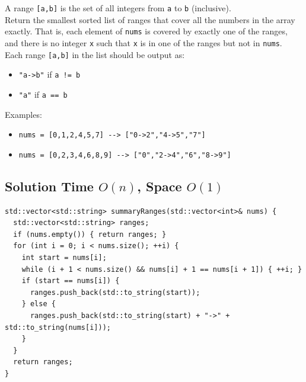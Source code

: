 A range {\colorbox{CodeBackground}{\lstinline|[a,b]|}} is the set of all integers from {\colorbox{CodeBackground}{\lstinline|a|}} to {\colorbox{CodeBackground}{\lstinline|b|}} (inclusive).\\

Return the smallest sorted list of ranges that cover all the numbers in the array exactly. That is, each element of {\colorbox{CodeBackground}{\lstinline|nums|}} is covered by exactly one of the ranges, and there is no integer {\colorbox{CodeBackground}{\lstinline|x|}} such that {\colorbox{CodeBackground}{\lstinline|x|}} is in one of the ranges but not in {\colorbox{CodeBackground}{\lstinline|nums|}}.\\

Each range {\colorbox{CodeBackground}{\lstinline|[a,b]|}} in the list should be output as:
\begin{itemize}
\item {\colorbox{CodeBackground}{\lstinline|"a->b"|}} if {\colorbox{CodeBackground}{\lstinline|a != b|}}
\item {\colorbox{CodeBackground}{\lstinline|"a"|}} if {\colorbox{CodeBackground}{\lstinline|a == b|}}
\end{itemize}

Examples:
\begin{itemize}
\item {\colorbox{CodeBackground}{\lstinline|nums = [0,1,2,4,5,7] --> ["0->2","4->5","7"]|}}
\item {\colorbox{CodeBackground}{\lstinline|nums = [0,2,3,4,6,8,9] --> ["0","2->4","6","8->9"]|}}
\end{itemize}

\subsection*{Solution {\scriptsize\color{gray}\Coffeecup\hspace{1mm}Time $O(n)$, Space $O(1)$}}
\begin{lstlisting}
std::vector<std::string> summaryRanges(std::vector<int>& nums) {
  std::vector<std::string> ranges;
  if (nums.empty()) { return ranges; }
  for (int i = 0; i < nums.size(); ++i) {
    int start = nums[i];
    while (i + 1 < nums.size() && nums[i] + 1 == nums[i + 1]) { ++i; }
    if (start == nums[i]) {
      ranges.push_back(std::to_string(start));
    } else {
      ranges.push_back(std::to_string(start) + "->" + std::to_string(nums[i]));
    }
  }
  return ranges;
}
\end{lstlisting}

